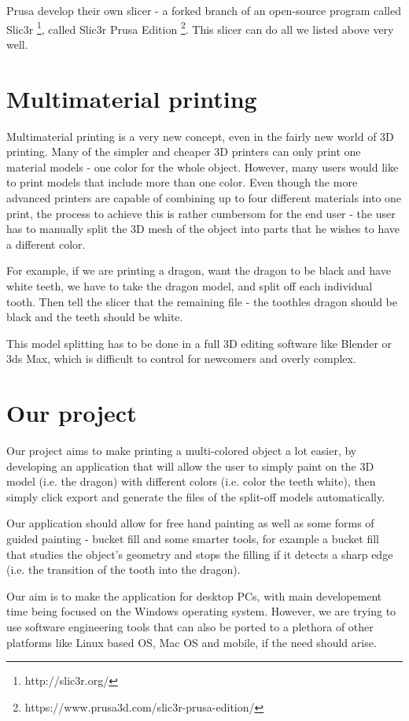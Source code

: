 Prusa develop their own slicer - a forked branch of an open-source program called Slic3r \footnote{http://slic3r.org/}, called Slic3r Prusa Edition \footnote{https://www.prusa3d.com/slic3r-prusa-edition/}. This slicer can do all we listed above very well.

\section{Multimaterial printing}

Multimaterial printing is a very new concept, even in the fairly new world of 3D printing. Many of the simpler and cheaper 3D printers can only print one material models - one color for the whole object. However, many users would like to print models that include more than one color. Even though the more advanced printers are capable of combining up to four different materials into one print, the process to achieve this is rather cumbersom for the end user - the user has to manually split the 3D mesh of the object into parts that he wishes to have a different color.

For example, if we are printing a dragon, want the dragon to be black and have white teeth, we have to take the dragon model, and split off each individual tooth. Then tell the slicer that the remaining file - the toothles dragon should be black and the teeth should be white.

This model splitting has to be done in a full 3D editing software like Blender or 3ds Max, which is difficult to control for newcomers and overly complex.

\section{Our project}

Our project aims to make printing a multi-colored object a lot easier, by developing an application that will allow the user to simply paint on the 3D model (i.e. the dragon) with different colors (i.e. color the teeth white), then simply click export and generate the files of the split-off models automatically.

Our application should allow for free hand painting as well as some forms of guided painting - bucket fill and some smarter tools, for example a bucket fill that studies the object's geometry and stops the filling if it detects a sharp edge (i.e. the transition of the tooth into the dragon).

Our aim is to make the application for desktop PCs, with main developement time being focused on the Windows operating system. However, we are trying to use software engineering tools that can also be ported to a plethora of other platforms like Linux based OS, Mac OS and mobile, if the need should arise.

